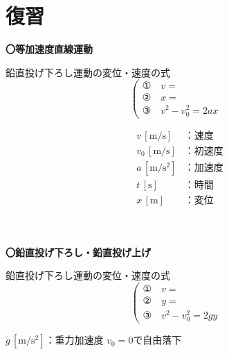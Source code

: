 \documentclass[11pt,twoside]{article}
\begin{document}
\section{\textbf{復習}}
\begin{itembox}[l]{\textbf{〇等加速度直線運動}}
	\begin{minipage}[t]{0.70\linewidth}
	鉛直投げ下ろし運動の変位・速度の式
	\Large
	\[
	\left(
	\begin{array}{ll}
		\text{①} \quad v = & \\
		\text{②} \quad x = & \\
		\text{③} \quad v^2 - v_0^2 = 2ax &
	\end{array}
	\right.
	\]
	\begin{center}
	\end{center}	
	\end{minipage}
	\hfill
	\begin{minipage}[t]{0.26\linewidth}
		\begin{shadebox}
			\begin{align*}
				v\,[\si{\metre\per\second}] &\text{：速度} \\
				v_0\,[\si{\metre\per\second}] &\text{：初速度} \\
				a\,[\si{\metre\per\second\squared}] &\text{：加速度} \\
				t\,[\si{\second}] &\text{：時間} \\
				x\,[\si{\metre}] &\text{：変位} \\
			\end{align*}
		\end{shadebox}
	\end{minipage}
\end{itembox}\\
\begin{itembox}[l]{\textbf{〇鉛直投げ下ろし・鉛直投げ上げ}}
	\begin{minipage}[t]{0.70\linewidth}
		鉛直投げ下ろし運動の変位・速度の式
		\Large
		\[
		\left(
		\begin{array}{ll}
			\text{①} \quad v = & \\
			\text{②} \quad y = & \\
			\text{③} \quad v^2 - v_0^2 = 2gy &
		\end{array}
		\right.
		\]
		\begin{shadebox}
			$g\,[\si{\metre\per\second\squared}] \text{：重力加速度}$
			$v_0=0$で自由落下
		\end{shadebox}
	\end{minipage}
	\hfill
	\begin{minipage}[t]{0.26\linewidth}
		\begin{center}
		\end{center}
	\end{minipage}
\end{itembox}
\end{document}
